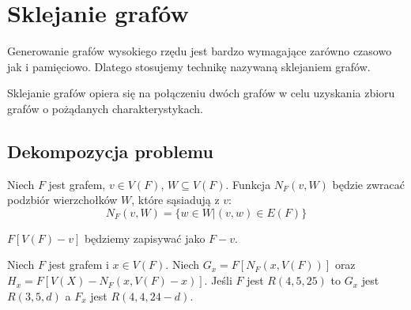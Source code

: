 \chapter{Sklejanie grafów}

Generowanie grafów wysokiego rzędu jest bardzo wymagające zarówno czasowo jak i pamięciowo. Dlatego stosujemy technikę nazywaną sklejaniem grafów. 
\begin{definition}
Sklejanie grafów opiera się na połączeniu dwóch grafów w celu uzyskania zbioru grafów o pożądanych charakterystykach.
\end{definition}
\section{Dekompozycja problemu}
\begin{definition}
  Niech $F$ jest grafem, $v \in V(F)$, $W \subseteq V(F)$. 
  Funkcja $N_F(v,W)$ będzie zwracać podzbiór wierzchołków $W$, które sąsiadują z $v$: 
  $$N_F(v,W) = \{w \in W | (v,w) \in E(F)\}$$ 
\end{definition}

\begin{definition}
  $F[V(F) - {v}]$ będziemy zapisywać jako $F - v$.
\end{definition}

\begin{theorem}
  Niech $F$ jest grafem i $x \in V(F)$. Niech $G_x = F[N_F(x,V(F))]$
  oraz $H_x = F[V(X) - N_F(x,V(F) - x)]$. Jeśli $F$ jest $R(4,5,25)$ to 
  $G_x$ jest $R(3,5,d)$ a $F_x$ jest $R(4,4,24-d)$.
\end{theorem}

